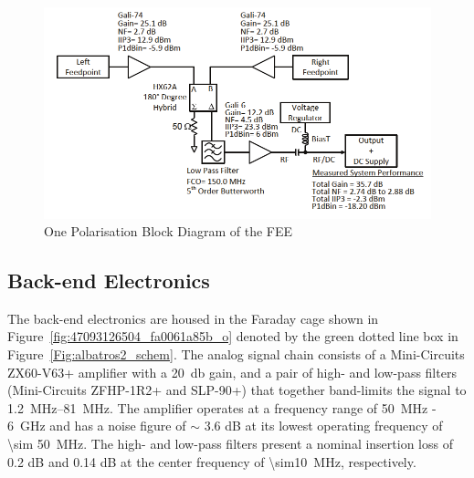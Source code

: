 \begin{figure}
	\begin{center}
		\includegraphics[width=\linewidth]{Figures/Balun_Block.png}
		\caption{One Polarisation Block Diagram of the FEE \cite{2012PASP..124.1090H}}
		\label{Fig:Balun Schematic}
	\end{center}
\end{figure}

\subsection{Back-end Electronics}

The back-end electronics are housed in the Faraday cage shown in Figure~\ref{fig:47093126504_fa0061a85b_o} denoted by the green dotted line box in Figure~\ref{Fig:albatros2_schem}. The analog signal chain consists of a Mini-Circuits ZX60-V63+ amplifier with a \SI{20}{\decibel} gain, and a pair of high- and low-pass filters (Mini-Circuits ZFHP-1R2+ and SLP-90+) that together band-limits the signal to \SIrange{1.2}{81}{\mega\hertz}. The amplifier operates at a frequency range of \SI{50}{\mega\hertz} - \SI{6}{\giga\hertz} and has a noise figure of $\sim$ 3.6 dB at its lowest operating frequency of \SI{\sim 50}{MHz}. The high- and low-pass filters present a nominal insertion loss of 0.2 dB and 0.14 dB at the center frequency of \SI{\sim10}{MHz}, respectively. 

